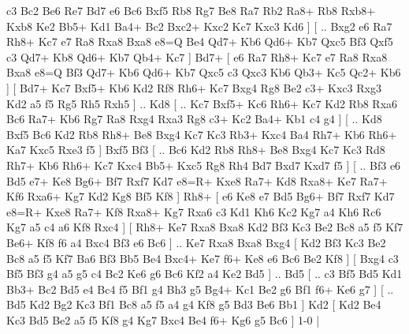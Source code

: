 c3  Bc2 Be6  Re7 Bd7  e6 Bc6  Bxf5 Rb8  Rg7 Be8  Ra7 Rb2  Ra8+ Rb8  Rxb8+ Kxb8  Ke2 Bb5+  Kd1 Ba4+  Bc2 Bxc2+  Kxc2 Kc7  Kxc3 Kd6   ]  [ .. Bxg2  e6 Ra7  Rh8+ Kc7  e7 Ra8  Rxa8 Bxa8  e8=Q Be4  Qd7+ Kb6  Qd6+ Kb7  Qxc5 Bf3  Qxf5 c3  Qd7+ Kb8  Qd6+ Kb7  Qb4+ Kc7   ]  Bd7+ [  e6 Ra7  Rh8+ Kc7  e7 Ra8  Rxa8 Bxa8  e8=Q Bf3  Qd7+ Kb6  Qd6+ Kb7  Qxc5 c3  Qxc3 Kb6  Qb3+ Kc5  Qc2+ Kb6   ]  [  Bd7+ Kc7  Bxf5+ Kb6  Kd2 Rf8  Rh6+ Kc7  Bxg4 Rg8  Be2 c3+  Kxc3 Rxg3  Kd2 a5  f5 Rg5  Rh5 Rxh5   ] .. Kd8 [ .. Kc7  Bxf5+ Kc6  Rh6+ Kc7  Kd2 Rb8  Rxa6 Bc6  Ra7+ Kb6  Rg7 Ra8  Rxg4 Rxa3  Rg8 c3+  Kc2 Ba4+  Kb1 c4  g4   ]  [ .. Kd8  Bxf5 Bc6  Kd2 Rb8  Rh8+ Be8  Bxg4 Kc7  Kc3 Rb3+  Kxc4 Ba4  Rh7+ Kb6  Rh6+ Ka7  Kxc5 Rxe3  f5   ]  Bxf5   Bf3 [ .. Bc6  Kd2 Rb8  Rh8+ Be8  Bxg4 Kc7  Kc3 Rd8  Rh7+ Kb6  Rh6+ Kc7  Kxc4 Bb5+  Kxc5 Rg8  Rh4 Bd7  Bxd7 Kxd7  f5   ]  [ .. Bf3  e6 Bd5  e7+ Ke8  Bg6+ Bf7  Rxf7 Kd7  e8=R+ Kxe8  Ra7+ Kd8  Rxa8+ Ke7  Ra7+ Kf6  Rxa6+ Kg7  Kd2 Kg8  Bf5 Kf8   ]  Rh8+ [  e6 Ke8  e7 Bd5  Bg6+ Bf7  Rxf7 Kd7  e8=R+ Kxe8  Ra7+ Kf8  Rxa8+ Kg7  Rxa6 c3  Kd1 Kh6  Kc2 Kg7  a4 Kh6  Rc6 Kg7  a5 c4  a6 Kf8  Rxc4   ]  [  Rh8+ Ke7  Rxa8 Bxa8  Kd2 Bf3  Kc3 Be2  Bc8 a5  f5 Kf7  Be6+ Kf8  f6 a4  Bxc4 Bf3  e6 Bc6   ] .. Ke7    Rxa8   Bxa8    Bxg4 [  Kd2 Bf3  Kc3 Be2  Bc8 a5  f5 Kf7  Ba6 Bf3  Bb5 Be4  Bxc4+ Ke7  f6+ Ke8  e6 Bc6  Be2 Kf8   ]  [  Bxg4 c3  Bf5 Bf3  g4 a5  g5 c4  Bc2 Ke6  g6 Bc6  Kf2 a4  Ke2 Bd5   ] .. Bd5 [ .. c3  Bf5 Bd5  Kd1 Bb3+  Bc2 Bd5  e4 Bc4  f5 Bf1  g4 Bh3  g5 Bg4+  Kc1 Be2  g6 Bf1  f6+ Ke6  g7   ]  [ .. Bd5  Kd2 Bg2  Kc3 Bf1  Bc8 a5  f5 a4  g4 Kf8  g5 Bd3  Be6 Bb1   ]  Kd2    [  Kd2 Be4  Kc3 Bd5  Be2 a5  f5 Kf8  g4 Kg7  Bxc4 Be4  f6+ Kg6  g5 Bc6   ] 1-0  |
